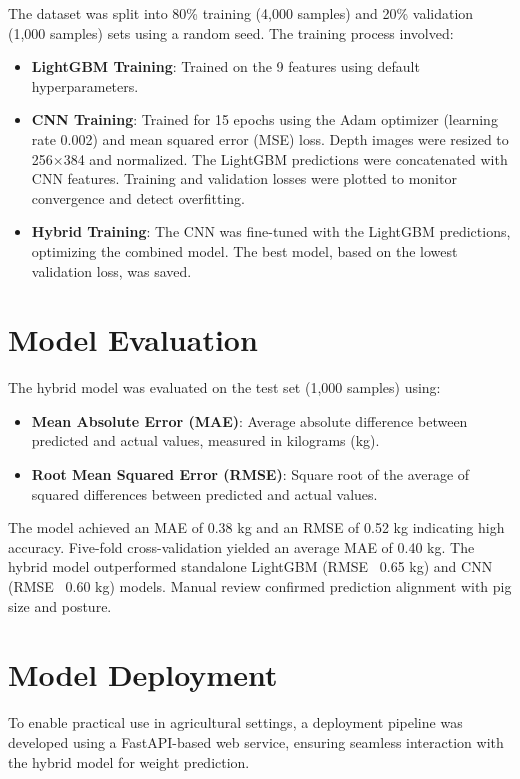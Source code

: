 {The dataset was split into 80\% training (4,000 samples) and 20\% validation (1,000 samples) sets using a random seed. The training process involved:
\begin{itemize}
	\item \textbf{LightGBM Training}: Trained on the 9 features using default hyperparameters.
	\item \textbf{CNN Training}: Trained for 15 epochs using the Adam optimizer (learning rate 0.002) and mean squared error (MSE) loss. Depth images were resized to 256$\times$384 and normalized. The LightGBM predictions were concatenated with CNN features. Training and validation losses were plotted to monitor convergence and detect overfitting.
	\item \textbf{Hybrid Training}: The CNN was fine-tuned with the LightGBM predictions, optimizing the combined model. The best model, based on the lowest validation loss, was saved.
\end{itemize}

\section{Model Evaluation} \label{Section 3.9}
The hybrid model was evaluated on the test set (1,000 samples) using:
\begin{itemize}
	\item \textbf{Mean Absolute Error (MAE)}: Average absolute difference between predicted and actual values, measured in kilograms (kg).
	\item \textbf{Root Mean Squared Error (RMSE)}: Square root of the average of squared differences between predicted and actual values.
\end{itemize}

The model achieved an MAE of 0.38 kg and an RMSE of 0.52 kg indicating high accuracy. Five-fold cross-validation yielded an average MAE of 0.40 kg. The hybrid model outperformed standalone LightGBM (RMSE ~0.65 kg) and CNN (RMSE ~0.60 kg) models. Manual review confirmed prediction alignment with pig size and posture.

\section{Model Deployment} \label{Section 3.10}
To enable practical use in agricultural settings, a deployment pipeline was developed using a FastAPI-based web service, ensuring seamless interaction with the hybrid model for weight prediction.

}
